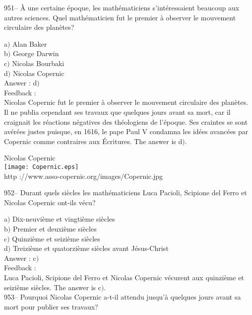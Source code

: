﻿\documentclass[letterpaper, 12pt]{article}
\begin{document}
951-- \`A une certaine \'epoque, les math\'ematiciens
s'int\'eressaient beaucoup aux autres sciences. Quel math\'ematicien
fut le premier \`a observer le mouvement circulaire des plan\`etes?

a$)$ Alan Baker \\
b$)$ George Darwin \\
c$)$ Nicolas Bourbaki  \\
d$)$ Nicolas Copernic \\

Answer : d$)$\\

Feedback : \\
Nicolas Copernic fut le premier \`a observer le mouvement circulaire
des plan\`etes. Il ne publia cependant ses travaux que quelques
jours avant sa mort, car il craignait les r\'eactions n\'egatives
des th\'eologiens de l'\'epoque. Ses craintes se sont av\'er\'ees
justes puisque, en 1616, le pape Paul V condamna les id\'ees
avanc\'ees par Copernic comme \og contraires aux
\'Ecritures\fg . The answer is d$)$.\\

        \begin{center}
        Nicolas Copernic\\
    \texttt{[image: Copernic.eps]}\\
        {\footnotesize http ://www.asso-copernic.org/images/Copernic.jpg}
    \end{center}

952-- Durant quels si\`ecles les math\'ematiciens Luca Pacioli,
Scipione del Ferro et Nicolas Copernic ont-ils v\'ecu?

a$)$ Dix-neuvi\`eme et vingti\`eme si\`ecles \\
b$)$ Premier et deuxi\`eme si\`ecles \\
c$)$ Quinzi\`eme et seizi\`eme si\`ecles  \\
d$)$ Treizi\`eme et quatorzi\`eme si\`ecles avant J\'esus-Christ\\

Answer : c$)$\\

Feedback : \\
Luca Pacioli, Scipione del Ferro et Nicolas Copernic v\'ecurent aux
quinzi\`eme et seizi\`eme si\`ecles. The answer is c$)$.\\

953-- Pourquoi Nicolas Copernic a-t-il attendu jusqu'\`a quelques
jours avant sa mort pour publier ses travaux?
\end{document}
